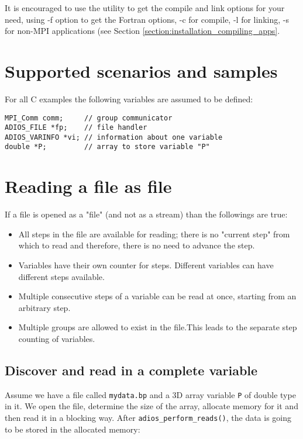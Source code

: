 It is encouraged to use the utility to get the compile and link options for your 
need, using -f option to get the Fortran options, -c for compile, -l for linking, 
-s for non-MPI applications (see Section \ref{section:installation_compiling_apps}. 

\section{Supported scenarios and samples}

For all C examples the following variables are assumed to be defined:
\begin{lstlisting}[frame=none]
MPI_Comm comm;     // group communicator
ADIOS_FILE *fp;    // file handler
ADIOS_VARINFO *vi; // information about one variable
double *P;         // array to store variable "P"
\end{lstlisting}


\section{Reading a file as file}
If a file is opened as a "file" (and not as a stream) than the followings are true:

  \begin{itemize}
  \item All steps in the file are available for reading; there is no "current step" from which to read and therefore, there is no need to advance the step.
  \item Variables have their own counter for steps. Different variables can have different steps available.
  \item Multiple consecutive steps of a variable can be read at once, starting from an arbitrary step.
  \item Multiple groups are allowed to exist in the file.This leads to the separate step counting of variables.
  \end{itemize}


\subsection{Discover and read in a complete variable}
Assume we have a file called \verb+mydata.bp+ and a 3D array variable \verb+P+ of double type in it. We open the file, determine the size of the array, allocate memory for it and then read it in a blocking way. After \verb+adios_perform_reads()+,  the data is going to be stored in the allocated memory:

